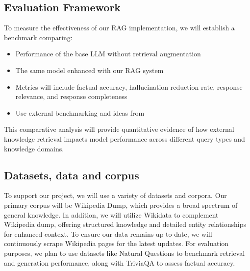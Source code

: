 \documentclass[fleqn,moreauthors,10pt]{ds_report}
\begin{document}
\subsection*{Evaluation Framework}
To measure the effectiveness of our RAG implementation, we will establish a benchmark comparing:

\begin{itemize}
\item Performance of the base LLM without retrieval augmentation
\item The same model enhanced with our RAG system
\item Metrics will include factual accuracy, hallucination reduction rate, response relevance, and response completeness
\item Use external benchmarking and ideas from \cite{chen} 
\end{itemize}

This comparative analysis will provide quantitative evidence of how external knowledge retrieval impacts model performance across different query types and knowledge domains.

\subsection*{Datasets, data and corpus}
To support our project, we will use a variety of datasets and corpora. Our primary corpus will be Wikipedia Dump, which provides a broad spectrum of general knowledge. In addition, we will utilize Wikidata to complement Wikipedia dump, offering structured knowledge and detailed entity relationships for enhanced context. To ensure our data remains up-to-date, we will continuously scrape Wikipedia pages for the latest updates. For evaluation purposes, we plan to use datasets like Natural Questions to benchmark retrieval and generation performance, along with TriviaQA to assess factual accuracy.  





\end{document}
